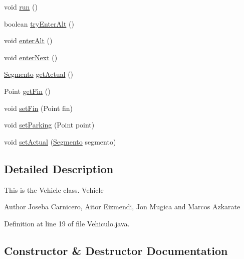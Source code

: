 \begin{DoxyCompactItemize}
\item 
void \mbox{\hyperlink{classsimulator_1_1_vehiculo_a4cbe0a3d742c02919a0c355f42f3e35d}{run}} ()
\item 
boolean \mbox{\hyperlink{classsimulator_1_1_vehiculo_a74f78a4942efa75589834e4ad4e95fc4}{try\+Enter\+Alt}} ()
\item 
void \mbox{\hyperlink{classsimulator_1_1_vehiculo_aee3cf4905b7d3668f705d8bab550cf78}{enter\+Alt}} ()
\item 
void \mbox{\hyperlink{classsimulator_1_1_vehiculo_ae2109a07a4719805b2b22fa2cfc74b9b}{enter\+Next}} ()
\item 
\mbox{\hyperlink{classsimulator_1_1_segmento}{Segmento}} \mbox{\hyperlink{classsimulator_1_1_vehiculo_ad6305ffaaa4eee022c07cac7515df015}{get\+Actual}} ()
\item 
Point \mbox{\hyperlink{classsimulator_1_1_vehiculo_a4adff38665fbd605cc1aadf42dae9787}{get\+Fin}} ()
\item 
void \mbox{\hyperlink{classsimulator_1_1_vehiculo_ac31a172023d50e9ac576ffb0f449bfb8}{set\+Fin}} (Point fin)
\item 
void \mbox{\hyperlink{classsimulator_1_1_vehiculo_a2515527cf1b20dfbd634f6bc54e3f8ad}{set\+Parking}} (Point point)
\item 
void \mbox{\hyperlink{classsimulator_1_1_vehiculo_ae8246a5b77441c21681ffd2033075348}{set\+Actual}} (\mbox{\hyperlink{classsimulator_1_1_segmento}{Segmento}} segmento)
\end{DoxyCompactItemize}


\subsection{Detailed Description}
This is the Vehicle class. Vehicle

\begin{DoxyAuthor}{Author}
Joseba Carnicero, Aitor Eizmendi, Jon Mugica and Marcos Azkarate 
\end{DoxyAuthor}


Definition at line 19 of file Vehiculo.\+java.



\subsection{Constructor \& Destructor Documentation}
\mbox{\label{classsimulator_1_1_vehiculo_a1614333acce021409a3bfe74a88750d4}} 
